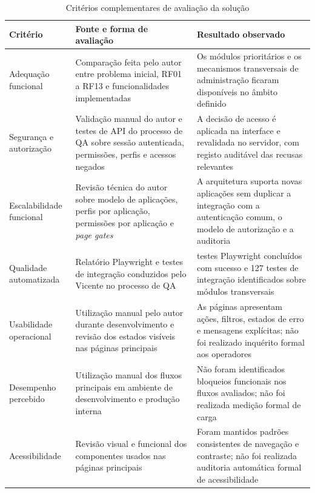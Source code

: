 \begin{table}[H]
\caption{Critérios complementares de avaliação da solução}
\label{tab:avaliacao_complementar}
\begin{center}
\begingroup
\scriptsize
\setlength{\tabcolsep}{4pt}
\begin{tabular}{|>{\raggedright\arraybackslash}p{2.4cm}|>{\raggedright\arraybackslash}p{5.2cm}|>{\raggedright\arraybackslash}p{4.5cm}|}
\hline
\textbf{Critério} & \textbf{Fonte e forma de avaliação} & \textbf{Resultado observado} \\ \hline
Adequação funcional & Comparação feita pelo autor entre problema inicial, RF01 a RF13 e funcionalidades implementadas & Os módulos prioritários e os mecanismos transversais de administração ficaram disponíveis no âmbito definido \\ \hline
Segurança e autorização & Validação manual do autor e testes de \gls{API} do processo de \gls{QA} sobre sessão autenticada, permissões, perfis e acessos negados & A decisão de acesso é aplicada na interface e revalidada no servidor, com registo auditável das recusas relevantes \\ \hline
Escalabilidade funcional & Revisão técnica do autor sobre modelo de aplicações, perfis por aplicação, permissões por aplicação e \textit{page gates} & A arquitetura suporta novas aplicações sem duplicar a integração com a autenticação comum, o modelo de autorização e a auditoria \\ \hline
Qualidade automatizada & Relatório Playwright e testes de integração conduzidos pelo Vicente no processo de \gls{QA} & 319 testes Playwright concluídos com sucesso e 127 testes de integração identificados sobre módulos transversais \\ \hline
Usabilidade operacional & Utilização manual pelo autor durante desenvolvimento e revisão dos estados visíveis nas páginas principais & As páginas apresentam ações, filtros, estados de erro e mensagens explícitas; não foi realizado inquérito formal aos operadores \\ \hline
Desempenho percebido & Utilização manual dos fluxos principais em ambiente de desenvolvimento e produção interna & Não foram identificados bloqueios funcionais nos fluxos avaliados; não foi realizada medição formal de carga \\ \hline
Acessibilidade & Revisão visual e funcional dos componentes usados nas páginas principais & Foram mantidos padrões consistentes de navegação e contraste; não foi realizada auditoria automática formal de acessibilidade \\ \hline
\end{tabular}
\endgroup
\end{center}
\end{table}


